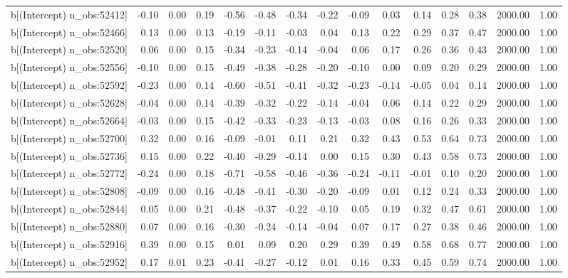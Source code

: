 \begin{table}[ht]
\begin{tabular}{rrrrrrrrrrrrrrr}
  b[(Intercept) n\_obs:52412] & -0.10 & 0.00 & 0.19 & -0.56 & -0.48 & -0.34 & -0.22 & -0.09 & 0.03 & 0.14 & 0.28 & 0.38 & 2000.00 & 1.00 \\ 
  b[(Intercept) n\_obs:52466] & 0.13 & 0.00 & 0.13 & -0.19 & -0.11 & -0.03 & 0.04 & 0.13 & 0.22 & 0.29 & 0.37 & 0.47 & 2000.00 & 1.00 \\ 
  b[(Intercept) n\_obs:52520] & 0.06 & 0.00 & 0.15 & -0.34 & -0.23 & -0.14 & -0.04 & 0.06 & 0.17 & 0.26 & 0.36 & 0.43 & 2000.00 & 1.00 \\ 
  b[(Intercept) n\_obs:52556] & -0.10 & 0.00 & 0.15 & -0.49 & -0.38 & -0.28 & -0.20 & -0.10 & 0.00 & 0.09 & 0.20 & 0.29 & 2000.00 & 1.00 \\ 
  b[(Intercept) n\_obs:52592] & -0.23 & 0.00 & 0.14 & -0.60 & -0.51 & -0.41 & -0.32 & -0.23 & -0.14 & -0.05 & 0.04 & 0.14 & 2000.00 & 1.00 \\ 
  b[(Intercept) n\_obs:52628] & -0.04 & 0.00 & 0.14 & -0.39 & -0.32 & -0.22 & -0.14 & -0.04 & 0.06 & 0.14 & 0.22 & 0.29 & 2000.00 & 1.00 \\ 
  b[(Intercept) n\_obs:52664] & -0.03 & 0.00 & 0.15 & -0.42 & -0.33 & -0.23 & -0.13 & -0.03 & 0.08 & 0.16 & 0.26 & 0.33 & 2000.00 & 1.00 \\ 
  b[(Intercept) n\_obs:52700] & 0.32 & 0.00 & 0.16 & -0.09 & -0.01 & 0.11 & 0.21 & 0.32 & 0.43 & 0.53 & 0.64 & 0.73 & 2000.00 & 1.00 \\ 
  b[(Intercept) n\_obs:52736] & 0.15 & 0.00 & 0.22 & -0.40 & -0.29 & -0.14 & 0.00 & 0.15 & 0.30 & 0.43 & 0.58 & 0.73 & 2000.00 & 1.00 \\ 
  b[(Intercept) n\_obs:52772] & -0.24 & 0.00 & 0.18 & -0.71 & -0.58 & -0.46 & -0.36 & -0.24 & -0.11 & -0.01 & 0.10 & 0.20 & 2000.00 & 1.00 \\ 
  b[(Intercept) n\_obs:52808] & -0.09 & 0.00 & 0.16 & -0.48 & -0.41 & -0.30 & -0.20 & -0.09 & 0.01 & 0.12 & 0.24 & 0.33 & 2000.00 & 1.00 \\ 
  b[(Intercept) n\_obs:52844] & 0.05 & 0.00 & 0.21 & -0.48 & -0.37 & -0.22 & -0.10 & 0.05 & 0.19 & 0.32 & 0.47 & 0.61 & 2000.00 & 1.00 \\ 
  b[(Intercept) n\_obs:52880] & 0.07 & 0.00 & 0.16 & -0.30 & -0.24 & -0.14 & -0.04 & 0.07 & 0.17 & 0.27 & 0.38 & 0.46 & 2000.00 & 1.00 \\ 
  b[(Intercept) n\_obs:52916] & 0.39 & 0.00 & 0.15 & 0.01 & 0.09 & 0.20 & 0.29 & 0.39 & 0.49 & 0.58 & 0.68 & 0.77 & 2000.00 & 1.00 \\ 
  b[(Intercept) n\_obs:52952] & 0.17 & 0.01 & 0.23 & -0.41 & -0.27 & -0.12 & 0.01 & 0.16 & 0.33 & 0.45 & 0.59 & 0.74 & 2000.00 & 1.00 \\ 

\end{tabular}
\end{table}
